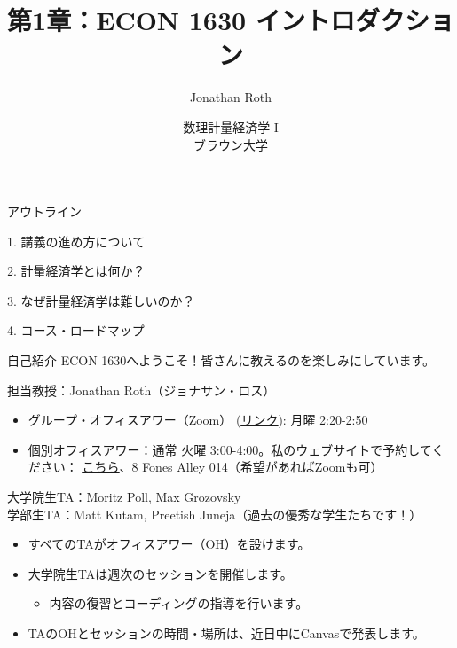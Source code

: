\documentclass[11pt,handout]{beamer}
\begin{document}
\begin{frame}[noframenumbering]{}
\vspace{0.5cm}
\title[]{第1章：ECON 1630 イントロダクション}
\author{Jonathan Roth}
\date{数理計量経済学 I \\ ブラウン大学\\} 
\titlepage {\small{}\ }\thispagestyle{empty} \vspace{-30pt}

\end{frame}
 
\begin{frame}{アウトライン}

1. 講義の進め方について
\vspace{0.8cm}

2. 計量経済学とは何か？
\vspace{0.8cm}

3. なぜ計量経済学は難しいのか？
\vspace{0.8cm}

4. コース・ロードマップ

\end{frame}

\begin{frame}{自己紹介}
\vspace{0.2cm}
ECON 1630へようこそ！皆さんに教えるのを楽しみにしています。
\vspace{0.5cm}

担当教授：Jonathan Roth（ジョナサン・ロス）

\begin{itemize}
\item グループ・オフィスアワー（Zoom） (\href{https://brown.zoom.us/my/jonroth}{\uline{リンク}}): 月曜 2:20-2:50 
\item 個別オフィスアワー：通常 火曜 3:00-4:00。私のウェブサイトで予約してください： \href{https://jonathandroth.github.io/OfficeHours/}{\uline{こちら}}、8 Fones Alley 014（希望があればZoomも可）

\end{itemize}
\vspace{0.4cm}

\pause{}

大学院生TA：Moritz Poll, Max Grozovsky \\

学部生TA：Matt Kutam, Preetish Juneja（過去の優秀な学生たちです！）

\begin{itemize}
	\item
	すべてのTAがオフィスアワー（OH）を設けます。
	
	\item
	大学院生TAは週次のセッションを開催します。
	
	\begin{itemize}
		\item 
		内容の復習とコーディングの指導を行います。
	\end{itemize}
	
	\item
	TAのOHとセッションの時間・場所は、近日中にCanvasで発表します。
\end{itemize}
 
\end{frame}
\end{document}
